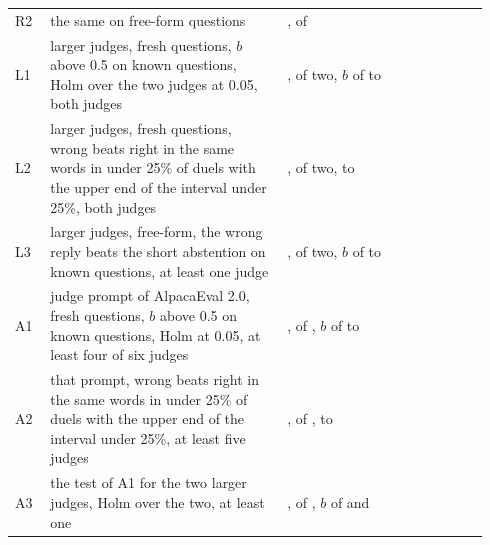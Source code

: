 \documentclass[11pt,letterpaper]{article}
\begin{document}
\begin{table}[h]
\begin{tabular}{@{}p{0.07\linewidth}p{0.47\linewidth}p{0.40\linewidth}@{}}
    R2 & the same on free-form questions & \rmRTwoOutcome{}, \rmRTwoPass{} of \rmCount{} \\
    L1 & larger judges, fresh questions, $b$ above 0.5 on known questions, Holm over the two judges at 0.05, both judges & \lgLOneOutcome{}, \lgLOnePass{} of two, $b$ of \lgBMin{} to \lgBMax{} \\
    L2 & larger judges, fresh questions, wrong beats right in the same words in under 25\% of duels with the upper end of the interval under 25\%, both judges & \lgLTwoOutcome{}, \lgLTwoPass{} of two, \lgCtrlMin{} to \lgCtrlMax{} \\
    L3 & larger judges, free-form, the wrong reply beats the short abstention on known questions, at least one judge & \lgLThreeOutcome{}, \lgLThreePass{} of two, $b$ of \lgFfBMin{} to \lgFfBMax{} \\
    A1 & judge prompt of AlpacaEval 2.0, fresh questions, $b$ above 0.5 on known questions, Holm at 0.05, at least four of six judges & \aeAOneOutcome{}, \aeAOnePass{} of \aeKept{}, $b$ of \aeBMin{} to \aeBMax{} \\
    A2 & that prompt, wrong beats right in the same words in under 25\% of duels with the upper end of the interval under 25\%, at least five judges & \aeATwoOutcome{}, \aeATwoPass{} of \aeKept{}, \aeCtrlMin{} to \aeCtrlMax{} \\
    A3 & the test of A1 for the two larger judges, Holm over the two, at least one & \aeAThreeOutcome{}, \aeAThreePass{} of \aeLargeKept{}, $b$ of \aeBQwen{} and \aeBGLM{} \\
    \bottomrule
  \end{tabular}
\end{table}
\end{document}
